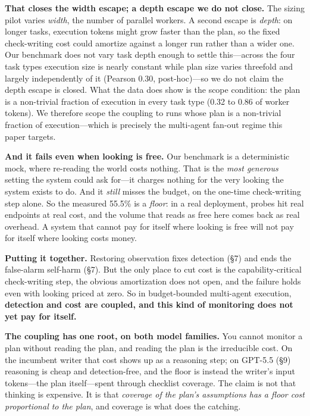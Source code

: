\documentclass[acmsmall,screen]{acmart}
\begin{document}
\textbf{That closes the width escape; a depth escape we do not close.} The sizing
pilot varies \emph{width}, the number of parallel workers. A second escape is
\emph{depth}: on longer tasks, execution tokens might grow faster than the plan,
so the fixed check-writing cost could amortize against a longer run rather than a
wider one. Our benchmark does not vary task depth enough to settle this---across
the four task types execution size is nearly constant while plan size varies
threefold and largely independently of it (Pearson 0.30, post-hoc)---so we do not
claim the depth escape is closed. What the data does show is the scope condition:
the plan is a non-trivial fraction of execution in every task type (0.32 to 0.86
of worker tokens). We therefore scope the coupling to runs whose plan is a
non-trivial fraction of execution---which is precisely the multi-agent fan-out
regime this paper targets.

\textbf{And it fails even when looking is free.} Our benchmark is a
deterministic mock, where re-reading the world costs nothing. That is the
\emph{most generous} setting the system could ask for---it charges nothing for
the very looking the system exists to do. And it \emph{still} misses the budget,
on the one-time check-writing step alone. So the measured 55.5\% is a
\emph{floor}: in a real deployment, probes hit real endpoints at real cost, and
the volume that reads as free here comes back as real overhead. A system that
cannot pay for itself where looking is free will not pay for itself where
looking costs money.

\textbf{Putting it together.} Restoring observation fixes detection (\S7) and
ends the false-alarm self-harm (\S7). But the only place to cut cost is the
capability-critical check-writing step, the obvious amortization does not open,
and the failure holds even with looking priced at zero. So in budget-bounded
multi-agent execution, \textbf{detection and cost are coupled, and this kind of
monitoring does not yet pay for itself.}

\textbf{The coupling has one root, on both model families.} You cannot monitor a
plan without reading the plan, and reading the plan is the irreducible cost. On
the incumbent writer that cost shows up as a reasoning step; on GPT-5.5 (\S9)
reasoning is cheap and detection-free, and the floor is instead the writer's
input tokens---the plan itself---spent through checklist coverage. The claim is
not that thinking is expensive. It is that \emph{coverage of the plan's
assumptions has a floor cost proportional to the plan}, and coverage is what does
the catching.
\end{document}
